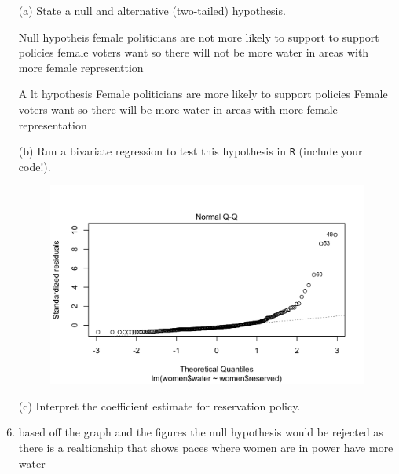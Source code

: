 \documentclass[12pt,letterpaper]{article}
\begin{document}
	
	\newpage
	\begin{enumerate}
		\item [(a)] State a null and alternative (two-tailed) hypothesis. 
		
		\item[Null hypotheis] female politicians are not more likely to support to support 
		policies female voters want so there will not be more water in areas
		with more female representtion
		\item[A]lt hypothesis Female politicians are more likely to support policies 
		Female voters want so there will be more water in areas with more female representation
		
		\vspace{6cm}
		\item [(b)] Run a bivariate regression to test this hypothesis in \texttt{R} (include your code!).
		
		

\begin{figure}[H]
	\centering
	\includegraphics[width=0.7\linewidth]{graph1}
	\caption{}
	\label{fig:graph1}
\end{figure}
	\vspace{6cm}
		\item [(c)] Interpret the coefficient estimate for reservation policy. 
		\item based off the graph and the figures the null hypothesis would be rejected as there is a realtionship that shows paces where women are in power have more water
		
	\end{enumerate}
	
\end{document}
